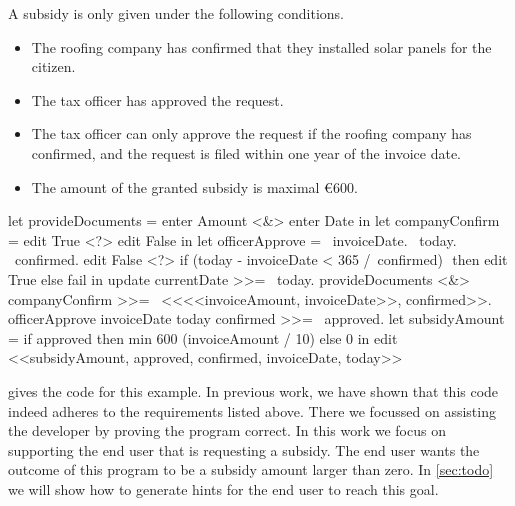 A subsidy is only given under the following conditions.
\begin{itemize}
\item The roofing company has confirmed that they installed solar panels for the citizen.
\item The tax officer has approved the request.
\item The tax officer can only approve the request if the roofing company has confirmed, and the request is filed within one year of the invoice date.
\item The amount of the granted subsidy is maximal €600.
\end{itemize}

\begin{TASK}[
    float=ht,
    numbers=right,
    caption={Subsidy request and approval workflow at the Dutch tax office.},
    label=lst:tax]
  let provideDocuments = enter Amount <&> enter Date in
  let companyConfirm = edit True <?> edit False in
  let officerApprove = \ invoiceDate. \ today. \ confirmed.
    edit False <?> if (today - invoiceDate < 365 /\ confirmed) $\label{lst:tax:officer-approve-def}$ then edit True else fail in
  update currentDate >>= \ today.$\label{lst:tax:citizen-info}$
  provideDocuments <&> companyConfirm >>= \ <<<<invoiceAmount, invoiceDate>>, confirmed>>. $\label{lst:tax:documents-and-company-confirm}$
  officerApprove invoiceDate today confirmed >>= \ approved.$\label{lst:tax:officer-approve}$
  let subsidyAmount = if approved then min 600 (invoiceAmount / 10) else 0 in
  edit <<subsidyAmount, approved, confirmed, invoiceDate, today>>$\label{lst:tax:result}$
\end{TASK}

 gives the \TOPHAT code for this example.
%
In previous work, we have shown that this code indeed adheres to the requirements listed above.
There we focussed on assisting the developer by proving the program correct.
In this work we focus on supporting the end user that is requesting a subsidy.
The end user wants the outcome of this program to be a subsidy amount larger than zero.
In \cref{sec:todo} we will show how to generate hints for the end user to reach this goal.
